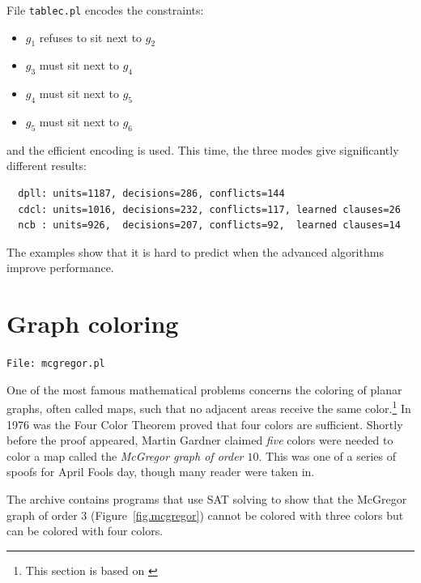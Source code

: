 \documentclass[11pt]{report}
\newcommand*{\p}[1]{\textup{\texttt{#1}}}
\newcommand*{\fl}[1]{\parbox{\textwidth}{\raggedleft \p{File: #1}}}
\begin{document}
File \p{tablec.pl} encodes the constraints:
\begin{itemize}
\item $g_1$ refuses to sit next to $g_2$
\item $g_3$ must  sit next to $g_4$
\item $g_4$ must  sit next to $g_5$
\item $g_5$ must  sit next to $g_6$ 
\end{itemize}
and the efficient encoding is used. This time, the three modes give
significantly different results:
\begin{verbatim}
  dpll: units=1187, decisions=286, conflicts=144
  cdcl: units=1016, decisions=232, conflicts=117, learned clauses=26
  ncb : units=926,  decisions=207, conflicts=92,  learned clauses=14
\end{verbatim}

The examples show that it is hard to predict when the advanced
algorithms improve performance.



\section{Graph coloring}\label{s.graph-color}

\fl{mcgregor.pl}

One of the most famous mathematical problems concerns the coloring of planar graphs, often called maps, such that no adjacent areas receive the same color.\footnote{This section is based on \cite[pp. 7, 134]{knuth-sat}} In 1976 was the Four Color Theorem proved that four colors are sufficient. Shortly before the proof appeared, Martin Gardner claimed \emph{five} colors were needed to color a map called the \emph{McGregor graph of order $10$}. This was one of a series of spoofs for April Fools day, though many reader were taken in.

The archive contains programs that use SAT solving to show that the McGregor graph of order $3$ (Figure~\ref{fig.mcgregor}) cannot be colored with three colors but can be colored with four colors.
\end{document}

